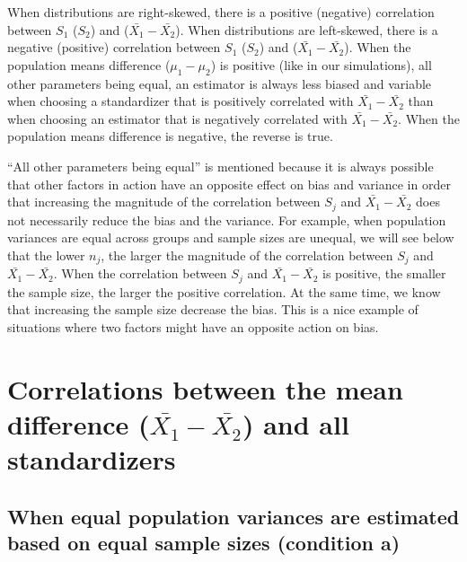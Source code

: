 \documentclass[
  man]{apa6}
\begin{document}
When distributions are right-skewed, there is a positive (negative) correlation between \(S_1\) (\(S_2\)) and (\(\bar{X_1}-\bar{X_2}\)). When distributions are left-skewed, there is a negative (positive) correlation between \(S_1\) (\(S_2\)) and (\(\bar{X_1}-\bar{X_2}\)). When the population means difference (\(\mu_1-\mu_2\)) is positive (like in our simulations), all other parameters being equal, an estimator is always less biased and variable when choosing a standardizer that is positively correlated with \(\bar{X_1}-\bar{X_2}\) than when choosing an estimator that is negatively correlated with \(\bar{X_1}-\bar{X_2}\). When the population means difference is negative, the reverse is true.

\enquote{All other parameters being equal} is mentioned because it is always possible that other factors in action have an opposite effect on bias and variance in order that increasing the magnitude of the correlation between \(S_j\) and \(\bar{X_1}-\bar{X_2}\) does not necessarily reduce the bias and the variance. For example, when population variances are equal across groups and sample sizes are unequal, we will see below that the lower \(n_j\), the larger the magnitude of the correlation between \(S_j\) and \(\bar{X_1}-\bar{X_2}\). When the correlation between \(S_j\) and \(\bar{X_1}-\bar{X_2}\) is positive, the smaller the sample size, the larger the positive correlation. At the same time, we know that increasing the sample size decrease the bias. This is a nice example of situations where two factors might have an opposite action on bias.

\hypertarget{correlations-between-the-mean-difference-barx_1-barx_2-and-all-standardizers}{%
\section{\texorpdfstring{Correlations between the mean difference (\(\bar{X_1}-\bar{X_2}\)) and all standardizers}{Correlations between the mean difference (\textbackslash bar\{X\_1\}-\textbackslash bar\{X\_2\}) and all standardizers}}\label{correlations-between-the-mean-difference-barx_1-barx_2-and-all-standardizers}}

\hypertarget{when-equal-population-variances-are-estimated-based-on-equal-sample-sizes-condition-a}{%
\subsection{When equal population variances are estimated based on equal sample sizes (condition a)}\label{when-equal-population-variances-are-estimated-based-on-equal-sample-sizes-condition-a}}
\end{document}
